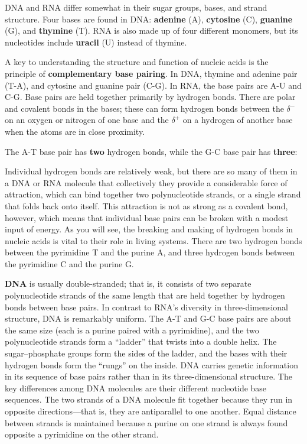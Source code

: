 \documentclass{report}
\begin{document}
DNA and RNA differ somewhat in their sugar groups, bases, and strand structure. Four bases are found in DNA: \textbf{adenine} (A), \textbf{cytosine} (C), \textbf{guanine} (G), and \textbf{thymine} (T). RNA is also made up of four different monomers, but its nucleotides include \textbf{uracil} (U) instead of thymine.

A key to understanding the structure and function of nucleic acids is the principle of \textbf{complementary base pairing}. In DNA, thymine and adenine pair (T-A), and cytosine and guanine pair (C-G). In RNA, the base pairs are A-U and C-G. Base pairs are held together primarily by hydrogen bonds. There are polar  and  covalent bonds in the bases; these can form hydrogen bonds between the \(\delta^{-}\) on an oxygen or nitrogen of one base and the \(\delta^{+}\) on a hydrogen of another base when the atoms are in close proximity.

The A-T base pair has \textbf{two} hydrogen bonds, while the G-C base pair has \textbf{three}:
\begin{center}
 \qquad {}
\end{center}

Individual hydrogen bonds are relatively weak, but there are so many of them in a DNA or RNA molecule that collectively they provide a considerable force of attraction, which can bind together two polynucleotide strands, or a single strand that folds back onto itself. This attraction is not as strong as a covalent bond, however, which means that individual base pairs can be broken with a modest input of energy. As you will see, the breaking and making of hydrogen bonds in nucleic acids is vital to their role in living systems. There are two hydrogen bonds between the pyrimidine T and the purine A, and three hydrogen bonds between the pyrimidine C and the purine G.

\textbf{DNA} is usually double-stranded; that is, it consists of two separate polynucleotide strands of the same length that are held together by hydrogen bonds between base pairs. In contrast to RNA's diversity in three-dimensional structure, DNA is remarkably uniform. The A-T and G-C base pairs are about the same size (each is a purine paired with a pyrimidine), and the two polynucleotide strands form a ``ladder'' that twists into a double helix. The sugar--phosphate groups form the sides of the ladder, and the bases with their hydrogen bonds form the ``rungs'' on the inside. DNA carries genetic information in its sequence of base pairs rather than in its three-dimensional structure. The key differences among DNA molecules are their different nucleotide base sequences. The two strands of a DNA molecule fit together because they run in opposite directions---that is, they are antiparallel to one another. Equal distance between strands is maintained because a purine on one strand is always found opposite a pyrimidine on the other strand.
\end{document}
